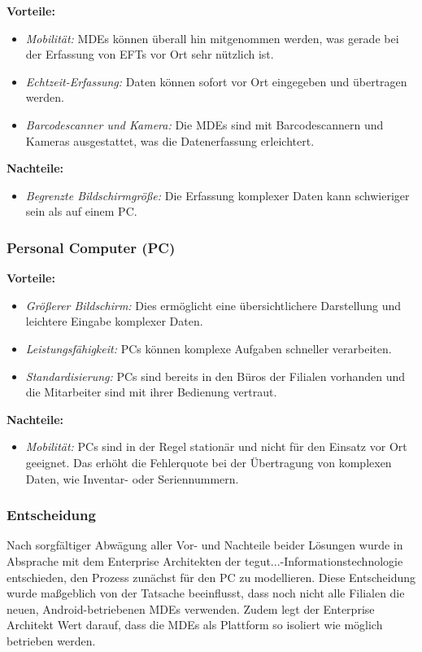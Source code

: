 \documentclass[12pt, a4paper]{article}
\begin{document}
\textbf{Vorteile:}
\begin{itemize}
\item \textit{Mobilität:} MDEs können überall hin mitgenommen werden, was gerade bei der Erfassung von EFTs vor Ort sehr nützlich ist.
\item \textit{Echtzeit-Erfassung:} Daten können sofort vor Ort eingegeben und übertragen werden.
\item \textit{Barcodescanner und Kamera:} Die MDEs sind mit Barcodescannern und Kameras ausgestattet, was die Datenerfassung erleichtert.
\end{itemize}

\textbf{Nachteile:}
\begin{itemize}
\item \textit{Begrenzte Bildschirmgröße:} Die Erfassung komplexer Daten kann schwieriger sein als auf einem PC.
\end{itemize}

\subsubsection{Personal Computer (PC)}

\textbf{Vorteile:}
\begin{itemize}
\item \textit{Größerer Bildschirm:} Dies ermöglicht eine übersichtlichere Darstellung und leichtere Eingabe komplexer Daten.
\item \textit{Leistungsfähigkeit:} PCs können komplexe Aufgaben schneller verarbeiten.
\item \textit{Standardisierung:} PCs sind bereits in den Büros der Filialen vorhanden und die Mitarbeiter sind mit ihrer Bedienung vertraut.
\end{itemize}

\textbf{Nachteile:}
\begin{itemize}
\item \textit{Mobilität:} PCs sind in der Regel stationär und nicht für den Einsatz vor Ort geeignet. Das erhöht die Fehlerquote bei der Übertragung von komplexen Daten,
wie Inventar- oder Seriennummern.
\end{itemize}

\subsubsection{Entscheidung}
Nach sorgfältiger Abwägung aller Vor- und Nachteile beider Lösungen wurde in Absprache mit dem Enterprise Architekten der tegut...-Informationstechnologie entschieden, 
den Prozess zunächst für den PC zu modellieren. Diese Entscheidung wurde maßgeblich von der Tatsache beeinflusst, dass noch nicht alle Filialen die neuen, Android-betriebenen 
MDEs verwenden. Zudem legt der Enterprise Architekt Wert darauf, dass die MDEs als Plattform so isoliert wie möglich betrieben werden.
\end{document}
